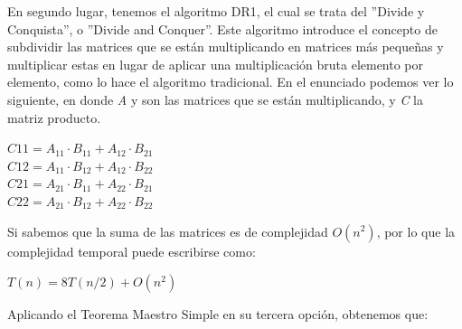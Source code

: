 \documentclass[12pt]{report}
\begin{document}
  \begin{center}
  \end{center}
    
  En segundo lugar, tenemos el algoritmo DR1, el cual se trata del ''Divide y Conquista'', o ''Divide and Conquer''. Este algoritmo introduce el concepto de subdividir las matrices que se están multiplicando en matrices más pequeñas y multiplicar estas en lugar de aplicar una multiplicación bruta elemento por elemento, como lo hace el algoritmo tradicional. En el enunciado podemos ver lo siguiente, en donde \textit{A} y  son las matrices que se están multiplicando, y \textit{C} la matriz producto.
  
  \begin{center}
    $ C11 = A_{11} \cdot B_{11} + A_{12} \cdot B_{21} $\\
    $ C12 = A_{11} \cdot B_{12} + A_{12} \cdot B_{22}$\\
    $ C21 = A_{21} \cdot B_{11} + A_{22} \cdot B_{21} $\\
    $ C22 = A_{21} \cdot B_{12} + A_{22} \cdot B_{22} $\\
  \end{center}
  
  Si sabemos que la suma de las matrices es de complejidad $O(n^2)$, por lo que la complejidad temporal puede escribirse como:
  
  \begin{center}
    $ T(n) = 8T(n/2) + O(n^2) $
  \end{center}
  
  Aplicando el Teorema Maestro Simple en su tercera opción, obtenemos que:
  
\end{document}
